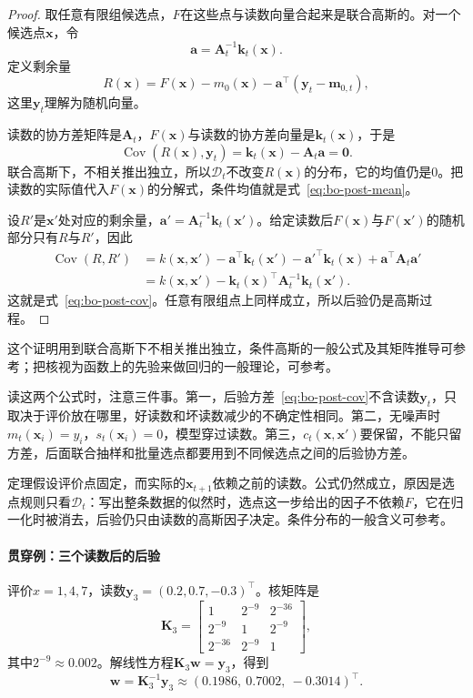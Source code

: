 \begin{proof}
取任意有限组候选点，$F$在这些点与读数向量合起来是联合高斯的。对一个候选点$\bm{x}$，令
\[
 \bm{a}=\bm{A}_t^{-1}\bm{k}_t(\bm{x}).
\]
定义剩余量
\[
 R(\bm{x})=F(\bm{x})-m_0(\bm{x})-\bm{a}^\top(\bm{y}_t-\bm{m}_{0,t}),
\]
这里$\bm{y}_t$理解为随机向量。

读数的协方差矩阵是$\bm{A}_t$，$F(\bm{x})$与读数的协方差向量是$\bm{k}_t(\bm{x})$，于是
\[
 \operatorname{Cov}(R(\bm{x}),\bm{y}_t)=\bm{k}_t(\bm{x})-\bm{A}_t\bm{a}=\bm{0}.
\]
联合高斯下，不相关推出独立，所以$\mathcal{D}_t$不改变$R(\bm{x})$的分布，它的均值仍是$0$。把读数的实际值代入$F(\bm{x})$的分解式，条件均值就是式~\eqref{eq:bo-post-mean}。

设$R'$是$\bm{x}'$处对应的剩余量，$\bm{a}'=\bm{A}_t^{-1}\bm{k}_t(\bm{x}')$。给定读数后$F(\bm{x})$与$F(\bm{x}')$的随机部分只有$R$与$R'$，因此
\[
 \begin{aligned}
 \operatorname{Cov}(R,R')
 &=k(\bm{x},\bm{x}')-\bm{a}^\top\bm{k}_t(\bm{x}')-\bm{a}'^\top\bm{k}_t(\bm{x})+\bm{a}^\top\bm{A}_t\bm{a}'\\
 &=k(\bm{x},\bm{x}')-\bm{k}_t(\bm{x})^\top\bm{A}_t^{-1}\bm{k}_t(\bm{x}').
 \end{aligned}
\]
这就是式~\eqref{eq:bo-post-cov}。任意有限组点上同样成立，所以后验仍是高斯过程。
\end{proof}

这个证明用到联合高斯下不相关推出独立，条件高斯的一般公式及其矩阵推导可参考；把核视为函数上的先验来做回归的一般理论，可参考。

读这两个公式时，注意三件事。第一，后验方差~\eqref{eq:bo-post-cov}不含读数$\bm{y}_t$，只取决于评价放在哪里，好读数和坏读数减少的不确定性相同。第二，无噪声时$m_t(\bm{x}_i)=y_i$，$s_t(\bm{x}_i)=0$，模型穿过读数。第三，$c_t(\bm{x},\bm{x}')$要保留，不能只留方差，后面联合抽样和批量选点都要用到不同候选点之间的后验协方差。

定理假设评价点固定，而实际的$\bm{x}_{t+1}$依赖之前的读数。公式仍然成立，原因是选点规则只看$\mathcal{D}_t$：写出整条数据的似然时，选点这一步给出的因子不依赖$F$，它在归一化时被消去，后验仍只由读数的高斯因子决定。条件分布的一般含义可参考。

\paragraph{贯穿例：三个读数后的后验}
评价$x=1,4,7$，读数$\bm{y}_3=(0.2,0.7,-0.3)^\top$。核矩阵是
\[
 \bm{K}_3=\begin{bmatrix}1&2^{-9}&2^{-36}\\2^{-9}&1&2^{-9}\\2^{-36}&2^{-9}&1\end{bmatrix},
\]
其中$2^{-9}\approx0.002$。解线性方程$\bm{K}_3\bm{w}=\bm{y}_3$，得到
\[
 \bm{w}=\bm{K}_3^{-1}\bm{y}_3\approx(0.1986,\ 0.7002,\ -0.3014)^\top.
\]

